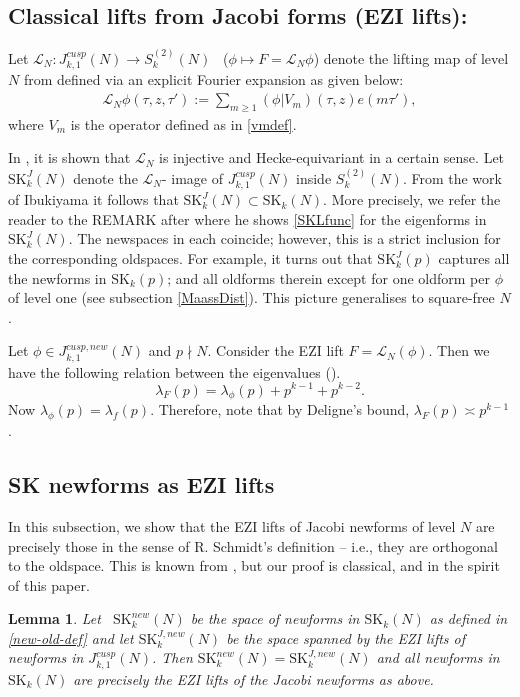 \documentclass[11pt]{amsart}
\numberwithin{equation}{section}
\theoremstyle{plain}
\newtheorem{lem}[thm]{Lemma}
\theoremstyle{definition}
\newcommand{\mc}{\mathcal}
\newcommand{\mrm}{\mathrm}
\newcommand{\sumn}{\sum \nolimits}
\newcommand{\sktwon}{S_k^{(2)}(N)}
\newcommand{\jkn}{J^{cusp}_{k,1}(N)}
\newcommand{\skk}{\mrm{SK}_k}
\newcommand{\skkn}{\mrm{SK}_k(N)}
\newcommand{\skkp}{\mrm{SK}_k(p)}
\begin{document}
\subsection{Classical lifts from Jacobi forms (EZI lifts):}\label{EZI Lifts}
Let $\mc L_N: J_{k,1}^{cusp}(N)\longrightarrow \sktwon$ \, ($\phi \mapsto F=\mc L_N \phi$) denote the lifting map of level $N$ from \cite{Ibu-SK} defined via an explicit Fourier expansion as given below:
\begin{align}
    \mc L_N \phi (\tau, z, \tau') := \sumn_{m \ge  1} (\phi|V_m)(\tau,z) e(m\tau'),
\end{align}
where $V_m$ is the operator defined as in \eqref{vmdef}.

In \cite{Ibu-SK}, it is shown that $\mc L_N$ is injective and Hecke-equivariant in a certain sense. Let $\skk^J(N)$ denote the $\mc L_N$- image of $J_{k,1}^{cusp}(N)$ inside $S_k^{(2)}(N)$. From the work of Ibukiyama \cite{Ibu-SK} it follows that $\skk^J(N)\subset \skkn$. More precisely, we refer the reader to the REMARK after \cite[Theorem~4.1]{Ibu-SK} where he shows \eqref{SKLfunc} for the eigenforms in $\skk^J(N)$.
The newspaces in each coincide; however, this is a strict inclusion for the corresponding oldspaces.
For example, it turns out that $\skk^J(p)$ captures all the newforms in $\skkp$; and all oldforms therein except for one oldform per $\phi$ of level one (see subsection \ref{MaassDist}). This picture generalises to square-free $N$.

Let $\phi\in J_{k,1}^{cusp,new}(N)$ and $p\nmid N$. Consider the EZI lift $F=\mc L_N(\phi)$. Then we have the following relation between the eigenvalues (\cite[Theorem 4.1]{Ibu-SK}).
\begin{equation}\label{Heckrel}
    \lambda_F(p)=\lambda_\phi(p)+p^{k-1}+p^{k-2}.
\end{equation}
Now $\lambda_\phi(p) =\lambda_f(p) $. Therefore, note that by Deligne's bound, $\displaystyle \lambda_F(p) \asymp p^{k-1}$.

\subsection{SK newforms as EZI lifts}
In this subsection, we show that the EZI lifts of Jacobi newforms of level $N$ are precisely those in the sense of R. Schmidt's definition -- i.e., they are orthogonal to the oldspace. This is known from \cite[Lem.~5.2.2]{saha-paul}, but our proof is classical, and in the spirit of this paper.

\begin{lem}\label{basisnew}
    Let ~$\skk^{new}(N)$ be the space of newforms in $\skkn$ as defined in \eqref{new-old-def} and let $\skk^{J,new}(N)$ be the space spanned by the EZI lifts of newforms in $\jkn$. Then $ \skk^{new}(N) = \skk^{J,new}(N)$ and all newforms in $\skkn$ are precisely the EZI lifts of the Jacobi newforms as above.
\end{lem}
\end{document}
